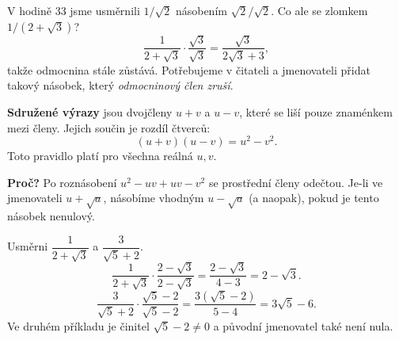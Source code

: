 \documentclass[11pt,a4paper]{article}
\begin{document}

V hodině 33 jsme usměrnili $1/\sqrt2$ násobením $\sqrt2/\sqrt2$.
Co ale se zlomkem $1/(2+\sqrt3)$?
\[
\frac1{2+\sqrt3}\cdot\frac{\sqrt3}{\sqrt3}
=\frac{\sqrt3}{2\sqrt3+3},
\]
takže odmocnina stále zůstává. Potřebujeme v čitateli a jmenovateli
přidat takový násobek, který \emph{odmocninový člen zruší}.

\begin{definiceBox}[title={Definice - Sdružené výrazy}]
\textbf{Sdružené výrazy} jsou dvojčleny $u+v$ a $u-v$,
které se liší pouze znaménkem mezi členy.
Jejich součin je rozdíl čtverců:
\[
\boxed{(u+v)(u-v)=u^2-v^2.}
\]
Toto pravidlo platí pro všechna reálná $u,v$.
\end{definiceBox}
\textbf{Proč?} Po roznásobení $u^2-uv+uv-v^2$ se prostřední členy
odečtou. Je-li ve jmenovateli $u+\sqrt a$, násobíme vhodným
$u-\sqrt a$ (a naopak), pokud je tento násobek nenulový.

\begin{prikladReseniBox}[breakable=false,title={Příklad 1}]
Usměrni $\dfrac1{2+\sqrt3}$ a $\dfrac3{\sqrt5+2}$.
\tcblower
\[
\frac1{2+\sqrt3}\cdot\frac{2-\sqrt3}{2-\sqrt3}
=\frac{2-\sqrt3}{4-3}=\boxed{2-\sqrt3}.
\]
\[
\frac3{\sqrt5+2}\cdot\frac{\sqrt5-2}{\sqrt5-2}
=\frac{3(\sqrt5-2)}{5-4}=\boxed{3\sqrt5-6}.
\]
Ve druhém příkladu je činitel $\sqrt5-2\ne0$ a původní jmenovatel také není nula.
\end{prikladReseniBox}
\end{document}
